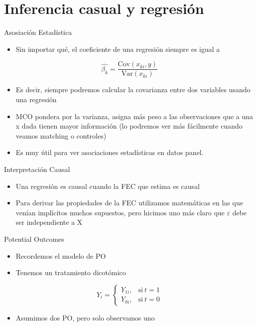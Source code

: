 \documentclass[
  ignorenonframetext,
]{beamer}
\providecommand{\tightlist}{%
  \setlength{\itemsep}{0pt}\setlength{\parskip}{0pt}}
\begin{document}
\hypertarget{inferencia-casual-y-regresiuxf3n}{%
\section{Inferencia casual y
regresión}\label{inferencia-casual-y-regresiuxf3n}}

\begin{frame}{Asosiación Estadística}
\protect\hypertarget{asosiaciuxf3n-estaduxedstica}{}
\begin{itemize}
\tightlist
\item
  Sin importar qué, el coeficiente de una regresión siempre es igual a
\end{itemize}

\[\hat{\beta_k}= \frac{\text{Cov}(x_{ki},y)}{\text{Var}(x_{ki})} \]

\begin{itemize}
\tightlist
\item
  Es decir, siempre podremos calcular la covarianza entre dos variables
  usando una regresión
\item
  MCO pondera por la varianza, asigna más peso a las observaciones que a
  una x dada tienen mayor información (lo podremos ver más fácilmente
  cuando veamos matching o controles)
\item
  Es muy útil para ver asociaciones estadísticas en datos panel.
\end{itemize}
\end{frame}

\begin{frame}{Interpretación Causal}
\protect\hypertarget{interpretaciuxf3n-causal}{}
\begin{itemize}
\tightlist
\item
  Una regresión es causal cuando la FEC que estima es causal
\item
  Para derivar las propiedades de la FEC utilizamos matemáticas en las
  que venían implícitos muchos supuestos, pero hicimos uno más claro que
  \(\varepsilon\) debe ser independiente a X
\end{itemize}
\end{frame}

\begin{frame}{Potential Outcomes}
\protect\hypertarget{potential-outcomes}{}
\begin{itemize}
\tightlist
\item
  Recordemos el modelo de PO
\item
  Tenemos un tratamiento dicotómico
\end{itemize}

\begin{equation}
Y_i=
  \begin{cases}
  Y_{1i} , & \text{si}\ t=1\\
  Y_{0i} , & \text{si}\ t=0
  \end{cases}
\end{equation}

\begin{itemize}
\tightlist
\item
  Asumimos dos PO, pero solo observamos uno
\end{itemize}
\end{frame}
\end{document}

